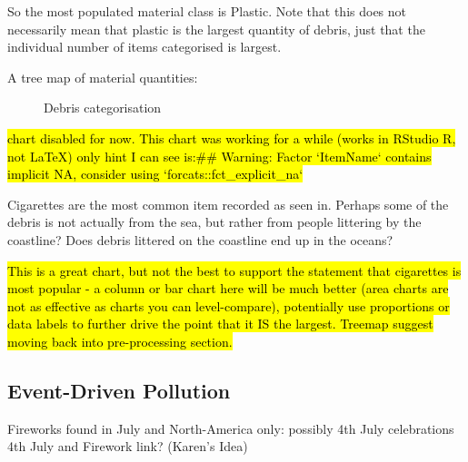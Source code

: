 \documentclass[10pt]{article}\usepackage[]{graphicx}\usepackage[]{color}
\begin{document}
So the most populated material class is Plastic. Note that this does not necessarily mean that plastic is the largest quantity of debris, just that the individual number of items categorised is largest.

A tree map of material quantities:
\begin{figure}[H] %
\begin{center}

\caption {Debris categorisation}
\label{figI}
\end {center}
\end {figure}
\hl{chart disabled for now. This chart was working for a while (works in RStudio R, not LaTeX) only hint I can see is:\#\# Warning: Factor `ItemName` contains implicit NA, consider using `forcats::fct\_explicit\_na`}

Cigarettes are the most common item recorded as seen in. %
Perhaps some of the debris is not actually from the sea, but rather from people littering by the coastline? Does debris littered on the coastline end up in the oceans?

\hl{This is a great chart, but not the best to support the statement that cigarettes is most popular - a column or bar chart here will be much better (area charts are not as effective as charts you can level-compare), potentially use proportions or data labels to further drive the point that it IS the largest. Treemap suggest moving back into pre-processing section.}



\subsection{Event-Driven Pollution}

Fireworks found in July and North-America only: possibly 4th July celebrations\\
4th July and Firework link? (Karen's Idea)\\
\end{document}
